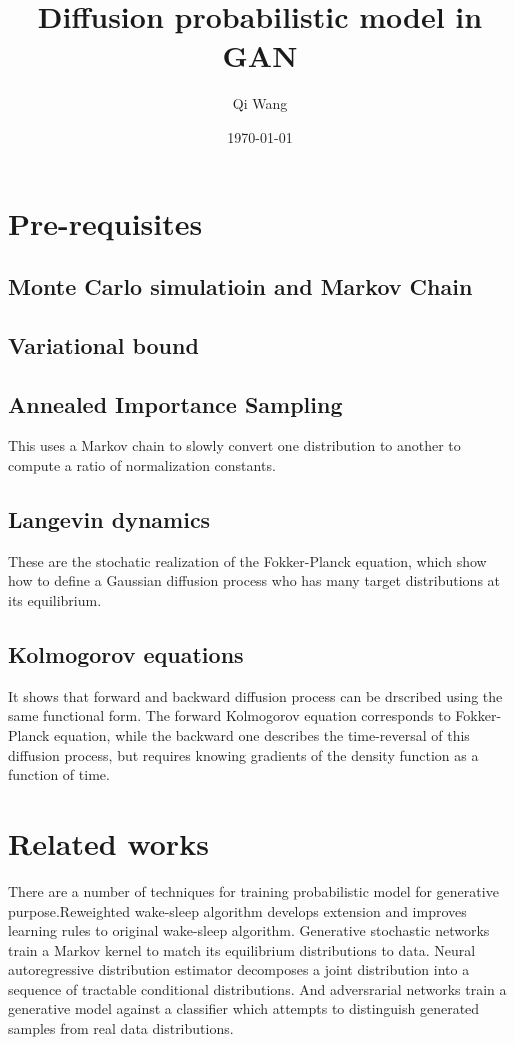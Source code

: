 \documentclass{article}
\title{Diffusion probabilistic model in GAN}
\author{Qi Wang}
\date{\today}
\begin{document}
\maketitle
\section{Pre-requisites}
\subsection*{Monte Carlo simulatioin and Markov Chain}
\subsection*{Variational bound}
\subsection*{Annealed Importance Sampling}
This uses a Markov chain to slowly convert one distribution to another to compute a ratio of normalization constants.
\subsection*{Langevin dynamics}
These are the stochatic realization of the Fokker-Planck equation, which show how to define a Gaussian diffusion process who has many target distributions at its equilibrium.
\subsection*{Kolmogorov equations}
It shows that forward and backward diffusion process can be drscribed using the same functional form. The forward Kolmogorov equation corresponds to Fokker-Planck equation, while the backward one  describes the time-reversal of this diffusion process, but requires knowing gradients of the density function as a function of time.
\section{Related works}
There are a number of techniques for training probabilistic model for generative purpose.Reweighted wake-sleep algorithm develops extension and improves learning rules to original wake-sleep algorithm. Generative stochastic networks train a Markov kernel to match its equilibrium distributions to data. Neural autoregressive distribution estimator decomposes a joint distribution into a sequence of tractable conditional distributions. And adversrarial networks train a generative model against a classifier which attempts to distinguish generated samples from real data distributions.
\end{document}
